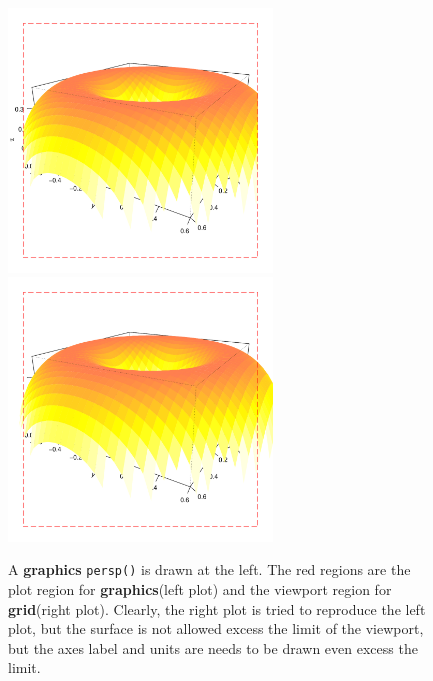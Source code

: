 \documentclass[paper=a4, fontsize=11pt]{report}
\begin{document}
\begin{figure}[h]
	\begin{center}
		\includegraphics[height = 7cm, width = 7cm]{figure/gridGraphics_persp_demo_viewport3_1.pdf}
		\includegraphics[height = 7cm, width = 7cm]{figure/gridGraphics_persp_demo_viewport3_2.pdf}
		\caption{A \textbf{graphics} \texttt{persp()} is drawn at the left. The red regions are the plot region for \textbf{graphics}(left plot) and the viewport region for \textbf{grid}(right plot). Clearly, the right plot is tried to reproduce the left plot, but the surface is not allowed excess the limit of the viewport, but the axes label and units are needs to be drawn even excess the limit.}
		\label{figure_4.5}
	\end{center}
\end{figure}
\end{document}
